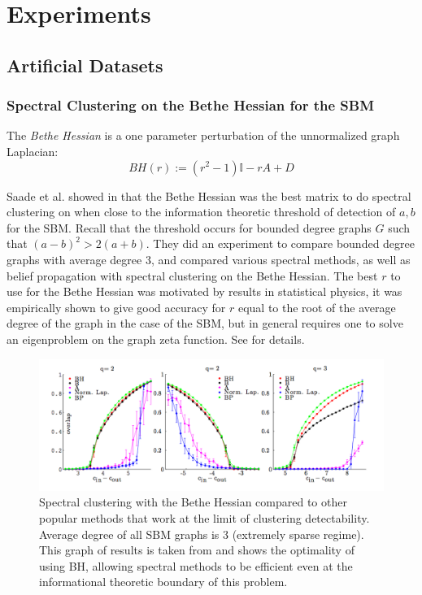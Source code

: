 \chapter{Experiments}
\section{Artificial Datasets}

\subsection{Spectral Clustering on the Bethe Hessian for the SBM}
\begin{definition}The 
\textit{Bethe Hessian} is a one parameter perturbation of the unnormalized graph Laplacian:  $$BH(r) := (r^2-1)\mathbb{I} - rA +D$$
\end{definition}

Saade et al. showed in \cite{AFL} that the Bethe Hessian was the best matrix to do spectral clustering on when close to the information theoretic threshold of detection of $a,b$ for the SBM.  Recall that the threshold occurs for bounded degree graphs $G$ such that $(a-b)^2 > 2(a+b)$.  They did an experiment to compare bounded degree graphs with average degree 3, and compared various spectral methods, as well as belief propagation with spectral clustering on the Bethe Hessian. The best $r$ to use for the Bethe Hessian was motivated by results in statistical physics, it was empirically shown to give good accuracy for $r$ equal to the root of the average degree of the graph in the case of the SBM, but in general requires one to solve an eigenproblem on the graph zeta function.  See \cite{AFL} for details. 

\begin{figure}[h]
  \begin{center}
  \includegraphics[scale=0.4]{BH_SBM.png}
  \caption{Spectral clustering with the Bethe Hessian compared to other popular methods that work at the limit of clustering detectability. Average degree of all SBM graphs is 3 (extremely sparse regime). This graph of results is taken from \cite{AFL} and shows the optimality of using BH, allowing spectral methods to be efficient even at the informational theoretic boundary of this problem.}
  \end{center}
\end{figure}

